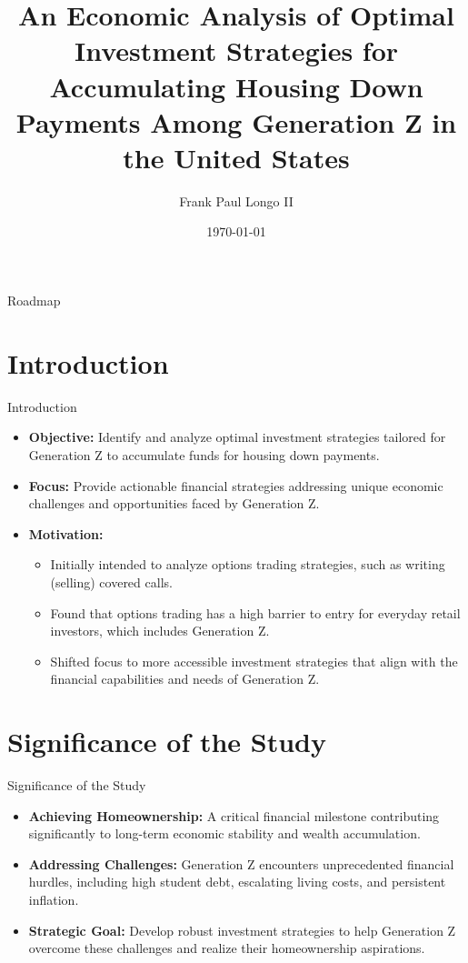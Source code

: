 \documentclass{beamer}
\title{An Economic Analysis of Optimal Investment Strategies for Accumulating Housing Down Payments Among Generation Z in the United States}
\author{Frank Paul Longo II}
\date{\today}
\begin{document}
\frame{\titlepage}

\begin{frame}{Roadmap}
    \tableofcontents
\end{frame}

\section{Introduction}
\begin{frame}{Introduction}
    \begin{itemize}
        \item \textbf{Objective:} Identify and analyze optimal investment strategies tailored for Generation Z to accumulate funds for housing down payments.
        \item \textbf{Focus:} Provide actionable financial strategies addressing unique economic challenges and opportunities faced by Generation Z.
        \item \textbf{Motivation:} 
        \begin{itemize}
            \item Initially intended to analyze options trading strategies, such as writing (selling) covered calls.
            \item Found that options trading has a high barrier to entry for everyday retail investors, which includes Generation Z.
            \item Shifted focus to more accessible investment strategies that align with the financial capabilities and needs of Generation Z.
        \end{itemize}
    \end{itemize}
\end{frame}

\section{Significance of the Study}
\begin{frame}{Significance of the Study}
    \begin{itemize}
        \item \textbf{Achieving Homeownership:} A critical financial milestone contributing significantly to long-term economic stability and wealth accumulation.
        \item \textbf{Addressing Challenges:} Generation Z encounters unprecedented financial hurdles, including high student debt, escalating living costs, and persistent inflation.
        \item \textbf{Strategic Goal:} Develop robust investment strategies to help Generation Z overcome these challenges and realize their homeownership aspirations.
    \end{itemize}
\end{frame}
\end{document}
